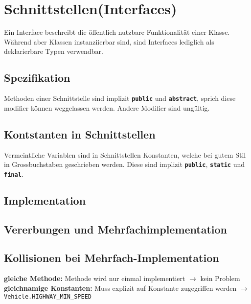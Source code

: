 \section*{Schnittstellen(Interfaces)}
	Ein Interface beschreibt die öffentlich nutzbare Funktionalität einer Klasse. Während aber Klassen instanziierbar sind, sind Interfaces lediglich als deklarierbare Typen verwendbar. \\
	\begin{minipage}[t]{8.3cm}
		\subsection*{Spezifikation}
			
			Methoden einer Schnittstelle sind implizit \textbf{\texttt{public}} und \textbf{\texttt{abstract}}, sprich diese modifier können weggelassen werden. Andere Modifier sind ungültig.
		\subsection*{Kontstanten in Schnittstellen}
			
			Vermeintliche Variablen sind in Schnittstellen Konstanten, welche bei gutem Stil in Grossbuchstaben geschrieben werden. Diese sind implizit \textbf{\texttt{public}}, \textbf{\texttt{static}} und \textbf{\texttt{final}}.
	\end{minipage}
	\hspace*{0.5cm}
	\begin{minipage}[t]{10cm}
		\subsection*{Implementation}
			
		\subsection*{Vererbungen und Mehrfachimplementation}
			
	\end{minipage}
	\subsection*{Kollisionen bei Mehrfach-Implementation}
	\textbf{gleiche Methode:} Methode wird nur einmal implementiert $\rightarrow$ kein Problem\\
	\textbf{gleichnamige Konstanten:} Muss explizit auf Konstante zugegriffen werden $\rightarrow$ \lstinline|Vehicle.HIGHWAY_MIN_SPEED|
	